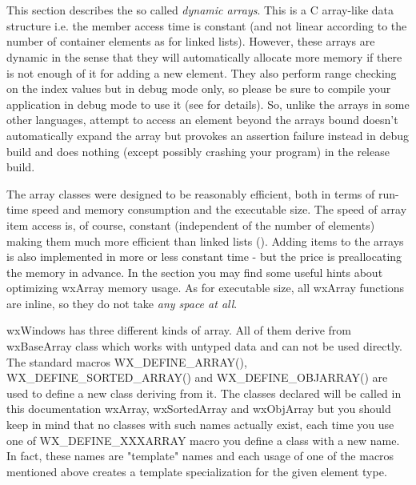 \section{}\label{wxarray}

This section describes the so called {\it dynamic arrays}. This is a C
array-like data structure i.e. the member access time is constant (and not
linear according to the number of container elements as for linked lists). However, these
arrays are dynamic in the sense that they will automatically allocate more
memory if there is not enough of it for adding a new element. They also perform
range checking on the index values but in debug mode only, so please be sure to
compile your application in debug mode to use it (see  for
details). So, unlike the arrays in some other
languages, attempt to access an element beyond the arrays bound doesn't
automatically expand the array but provokes an assertion failure instead in
debug build and does nothing (except possibly crashing your program) in the
release build.

The array classes were designed to be reasonably efficient, both in terms of
run-time speed and memory consumption and the executable size. The speed of
array item access is, of course, constant (independent of the number of elements)
making them much more efficient than linked lists ().
Adding items to the arrays is also implemented in more or less constant time -
but the price is preallocating the memory in advance. In the  section
you may find some useful hints about optimizing wxArray memory usage. As for executable size, all
wxArray functions are inline, so they do not take {\it any space at all}.

wxWindows has three different kinds of array. All of them derive from
wxBaseArray class which works with untyped data and can not be used directly.
The standard macros WX\_DEFINE\_ARRAY(), WX\_DEFINE\_SORTED\_ARRAY() and
WX\_DEFINE\_OBJARRAY() are used to define a new class deriving from it. The
classes declared will be called in this documentation wxArray, wxSortedArray and
wxObjArray but you should keep in mind that no classes with such names actually
exist, each time you use one of WX\_DEFINE\_XXXARRAY macro you define a class
with a new name. In fact, these names are "template" names and each usage of one
of the macros mentioned above creates a template specialization for the given
element type.

